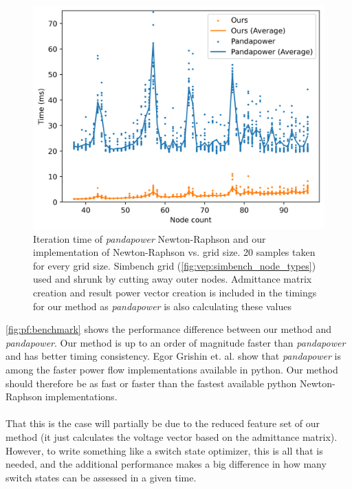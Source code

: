 \begin{figure}[H]
    \centering
    \includegraphics[width=.65\linewidth]{img/benchmark/pandapower_avg.png}
    \caption{
        Iteration time of \textit{pandapower}\autocite{pandapower2018} Newton-Raphson and our implementation of
        Newton-Raphson vs. grid size. 20 samples taken for every grid size. Simbench
        grid (\autoref{fig:vep:simbench_node_types}) used and shrunk by cutting
        away outer nodes. Admittance matrix creation and result power vector creation 
        is included in the timings for our method as \textit{pandapower} is also calculating
        these values
    }
    \label{fig:pf:benchmark}
\end{figure}

\autoref{fig:pf:benchmark} shows the performance difference between our method and \textit{pandapower}.
Our method is up to an order of magnitude faster than \textit{pandapower} and has better timing
consistency. Egor Grishin et. al. show that \textit{pandapower} is among the faster power flow
implementations available in python\autocite{newton_raphson_python}. Our method should therefore
be as fast or faster than the fastest available python Newton-Raphson implementations.\\
\\
That this is the case will partially be due to the reduced feature set of our method
(it just calculates the voltage vector based on the admittance matrix). However, to write
something like a switch state optimizer, this is all that is needed, and the additional
performance makes a big difference in how many switch states can be assessed in a given time.

